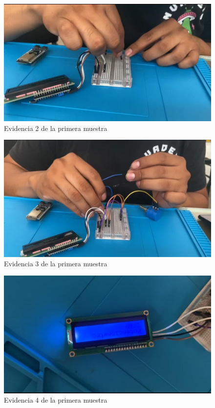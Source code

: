 \begin{figure}[H]
        \centering
        \includegraphics[trim = {0mm 0mm 0mm 0mm},clip,scale=0.2]{10/Img/muestra1Prueba2.jpg}
        \caption{Evidencia 2 de la primera muestra}
        \label{muestra1Prueba2}
    \end{figure}

\begin{figure}[H]
        \centering
        \includegraphics[trim = {0mm 0mm 0mm 0mm},clip,scale=0.2]{10/Img/muestra1Prueba3.jpg}
        \caption{Evidencia 3 de la primera muestra}
        \label{muestra1Prueba3}
    \end{figure}

\begin{figure}[H]
        \centering
        \includegraphics[trim = {0mm 0mm 0mm 0mm},clip,scale=0.2]{10/Img/muestra1Prueba4.jpg}
        \caption{Evidencia 4 de la primera muestra}
        \label{muestra1Prueba4}
    \end{figure}

